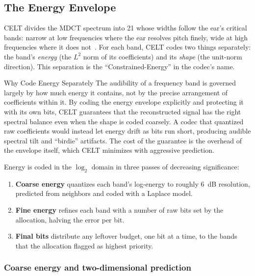 \subsection{The Energy Envelope}\label{subsec:celt_energy}

CELT divides the MDCT spectrum into 21  whose widths follow the
ear's critical bands: narrow at low frequencies where the ear resolves pitch
finely, wide at high frequencies where it does
not~\cite{zwicker1999psychoacoustics}.
For each band, CELT codes two things separately: the band's \emph{energy} (the
$L^2$ norm of its coefficients) and its \emph{shape} (the unit-norm direction).
This separation is the ``Constrained-Energy'' in the codec's name.

\begin{concept}{Why Code Energy Separately}
  The audibility of a frequency band is governed largely by how much energy it
  contains, not by the precise arrangement of coefficients within it. By coding
  the energy envelope explicitly and protecting it with its own bits, CELT
  guarantees that the reconstructed signal has the right spectral balance even
  when the shape is coded coarsely. A codec that quantized raw
  coefficients would
  instead let energy drift as bits run short, producing audible
  spectral tilt and
  ``birdie'' artifacts. The cost of the guarantee is the overhead of
  the envelope
  itself, which CELT minimizes with aggressive prediction.
\end{concept}

Energy is coded in the $\log_2$ domain in three passes of decreasing
significance:

\begin{enumerate}[itemsep=3pt]
  \item \textbf{Coarse energy} quantizes each band's log-energy to roughly 6~dB
    resolution, predicted from neighbors and coded with a Laplace model.
  \item \textbf{Fine energy} refines each band with a number of raw bits set by
    the allocation, halving the error per bit.
  \item \textbf{Final bits} distribute any leftover budget, one bit at a time,
    to the bands that the allocation flagged as highest priority.
\end{enumerate}

\subsubsection{Coarse energy and two-dimensional prediction}

